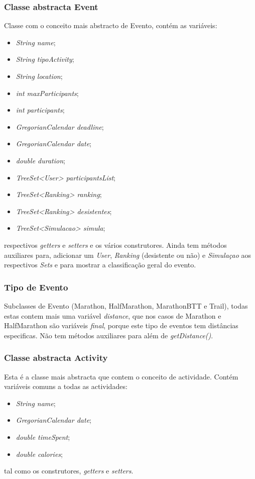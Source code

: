 \documentclass[10pt,notitlepage]{article}
\begin{document}
\subsubsection{Classe abstracta Event}

Classe com o conceito mais abstracto de Evento, contém as variáveis:
\begin{itemize}
\item \textit{String name};
\item \textit{String tipoActivity};
\item \textit{String location};
\item \textit{int maxParticipants};
\item \textit{int participants};
\item \textit{GregorianCalendar deadline};
\item \textit{GregorianCalendar date};
\item \textit{double duration};
\item \textit{TreeSet<User> participantsList};
\item \textit{TreeSet<Ranking> ranking};
\item \textit{TreeSet<Ranking> desistentes};
\item \textit{TreeSet<Simulacao> simula};
\end{itemize}
respectivos \textit{getters} e \textit{setters} e os vários construtores. Ainda tem métodos auxiliares para, adicionar um \textit{User}, \textit{Ranking} (desistente ou não) e \textit{Simulaçao} aos respectivos \textit{Sets} e para mostrar a classificação geral do evento.


\subsubsection{Tipo de Evento}

Subclasses de Evento (Marathon, HalfMarathon, MarathonBTT e Trail), todas estas contem mais uma variável \textit{distance}, que nos casos de Marathon e HalfMarathon são variáveis \textit{final}, porque este tipo de eventos tem distâncias especificas. Não tem métodos auxiliares para além de \textit{getDistance()}.


\subsubsection{Classe abstracta Activity}

Esta é a classe mais abstracta que contem o conceito de actividade. Contém variáveis comuns a todas as actividades:
\begin{itemize}
\item \textit{String name};
\item \textit{GregorianCalendar date};
\item \textit{double timeSpent};
\item \textit{double calories};
\end{itemize}
tal como os construtores, \textit{getters} e \textit{setters}.
\end{document}
